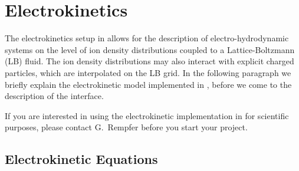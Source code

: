 \newcommand{\lb}{l_\mathrm{B}}
\newcommand{\kT}{k_\mathrm{B}T}

\chapter{\label{sec:electrokinetics}Electrokinetics}

The electrokinetics setup in \es{} allows for the description of
electro-hydrodynamic systems on the level of ion density distributions
coupled to a Lattice-Boltzmann (LB) fluid. The ion density
distributions may also interact with explicit charged particles, which
are interpolated on the LB grid.  In the following paragraph we
briefly explain the electrokinetic model implemented in \es, before
we come to the description of the interface.

If you are interested in using the electrokinetic implementation in
\es for scientific purposes, please contact G.~Rempfer before you
start your project.

\section{Electrokinetic Equations}

